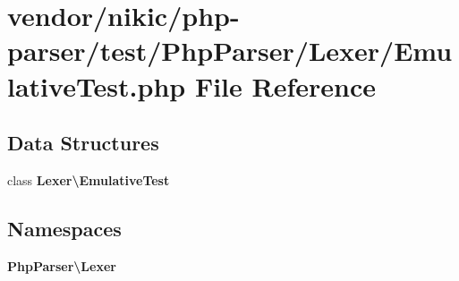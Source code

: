 \section{vendor/nikic/php-\/parser/test/\+Php\+Parser/\+Lexer/\+Emulative\+Test.php File Reference}
\label{_emulative_test_8php}
\subsection*{Data Structures}
\begin{DoxyCompactItemize}
\item 
class {\bf Lexer\textbackslash{}\+Emulative\+Test}
\end{DoxyCompactItemize}
\subsection*{Namespaces}
\begin{DoxyCompactItemize}
\item 
 {\bf Php\+Parser\textbackslash{}\+Lexer}
\end{DoxyCompactItemize}
